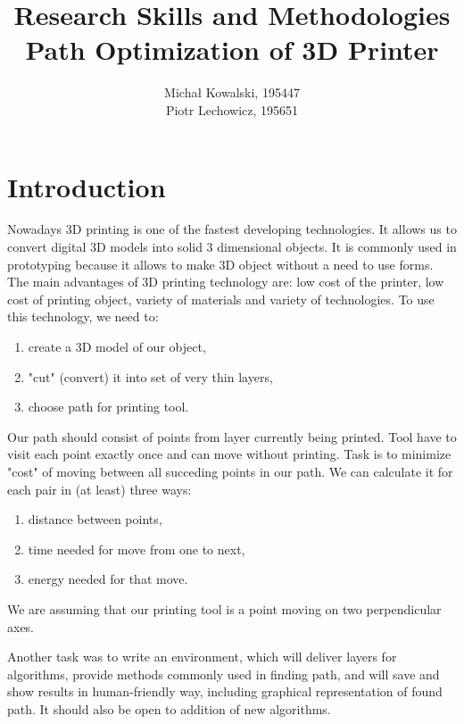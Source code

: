 \documentclass[titlepage]{article}
\title{Research Skills and Methodologies\\Path Optimization of 3D Printer}
\author{Michał Kowalski, 195447\\Piotr Lechowicz, 195651}
\date{}
\begin{document}
\maketitle

\section{Introduction}
Nowadays 3D printing is one of the fastest developing technologies. It allows us to convert digital 3D models into solid 3 dimensional objects. It is commonly used in prototyping because it allows to make 3D object without a need to use forms. The main advantages of 3D printing technology are: low cost of the printer, low cost of printing object, variety of materials and variety of technologies.
To use this technology, we need to:
\begin{enumerate}
\item create a 3D model of our object,
\item "cut" (convert) it into set of very thin layers,
\item choose path for printing tool.
\end{enumerate}
Our path should consist of points from layer currently being printed. Tool have to visit each point exactly once and can move without printing. Task is to minimize "cost" of moving between all succeding points in our path. We can calculate it for each pair in (at least) three ways:
\begin{enumerate}
\item distance between points,
\item time needed for move from one to next,
\item energy needed for that move.
\end{enumerate}
We are assuming that our printing tool is a point moving on two perpendicular axes.

Another task was to write an environment, which will deliver layers for algorithms, provide methods commonly used in finding path, and will save and show results in human-friendly way, including graphical representation of found path. It should also be open to addition of new algorithms.

\pagebreak
\end{document}
